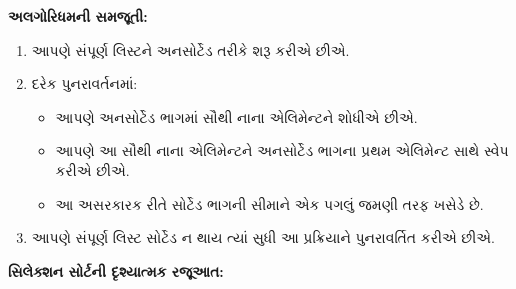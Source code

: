 \begin{Shaded}
\begin{Highlighting}[]
\OperatorTok{=} 
    
     
\OperatorTok{=}
         \OperatorTok{+}
            \OperatorTok{\textless{}}
\OperatorTok{=}
        
\OperatorTok{=}
    
\end{Highlighting}
\end{Shaded}

\textbf{અલગોરિધમની સમજૂતી:}

\begin{enumerate}
\def\labelenumi{\arabic{enumi}.}
\tightlist
\item
  આપણે સંપૂર્ણ લિસ્ટને અનસોર્ટેડ તરીકે શરૂ કરીએ છીએ.
\item
  દરેક પુનરાવર્તનમાં:

  \begin{itemize}
  \tightlist
  \item
    આપણે અનસોર્ટેડ ભાગમાં સૌથી નાના એલિમેન્ટને શોધીએ છીએ.
  \item
    આપણે આ સૌથી નાના એલિમેન્ટને અનસોર્ટેડ ભાગના પ્રથમ એલિમેન્ટ સાથે સ્વેપ કરીએ છીએ.
  \item
    આ અસરકારક રીતે સોર્ટેડ ભાગની સીમાને એક પગલું જમણી તરફ ખસેડે છે.
  \end{itemize}
\item
  આપણે સંપૂર્ણ લિસ્ટ સોર્ટેડ ન થાય ત્યાં સુધી આ પ્રક્રિયાને પુનરાવર્તિત કરીએ છીએ.
\end{enumerate}

\textbf{સિલેક્શન સોર્ટની દૃશ્યાત્મક રજૂઆત:}

\begin{Shaded}
\begin{Highlighting}[]
\end{Highlighting}
\end{Shaded}

